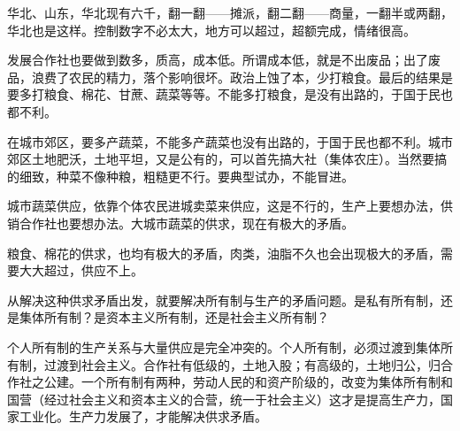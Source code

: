 华北、山东，华北现有六千，翻一翻——摊派，翻二翻——商量，一翻半或两翻，华北也是这样。控制数字不必太大，地方可以超过，超额完成，情绪很高。

发展合作社也要做到数多，质高，成本低。所谓成本低，就是不出废品；出了废品，浪费了农民的精力，落个影响很坏。政治上蚀了本，少打粮食。最后的结果是要多打粮食、棉花、甘蔗、蔬菜等等。不能多打粮食，是没有出路的，于国于民也都不利。

在城市郊区，要多产蔬菜，不能多产蔬菜也没有出路的，于国于民也都不利。城市郊区土地肥沃，土地平坦，又是公有的，可以首先搞大社（集体农庄）。当然要搞的细致，种菜不像种粮，粗糙更不行。要典型试办，不能冒进。

城市蔬菜供应，依靠个体农民进城卖菜来供应，这是不行的，生产上要想办法，供销合作社也要想办法。大城市蔬菜的供求，现在有极大的矛盾。

粮食、棉花的供求，也均有极大的矛盾，肉类，油脂不久也会出现极大的矛盾，需要大大超过，供应不上。

从解决这种供求矛盾出发，就要解决所有制与生产的矛盾问题。是私有所有制，还是集体所有制？是资本主义所有制，还是社会主义所有制？

个人所有制的生产关系与大量供应是完全冲突的。个人所有制，必须过渡到集体所有制，过渡到社会主义。合作社有低级的，土地入股；有高级的，土地归公，归合作社之公建。一个所有制有两种，劳动人民的和资产阶级的，改变为集体所有制和国营（经过社会主义和资本主义的合营，统一于社会主义）这才是提高生产力，国家工业化。生产力发展了，才能解决供求矛盾。


